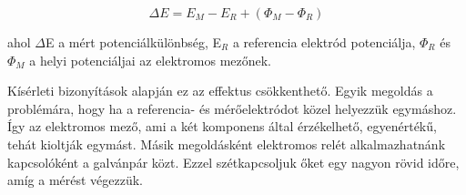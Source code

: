 \begin{equation}
\Delta E = E_M - E_R + (\Phi_M - \Phi_R) 
\label{eq:field1}
\end{equation}

ahol $\Delta$E a mért potenciálkülönbség, E$_R$ a referencia elektród potenciálja, $\Phi_R$ és $\Phi_M$ a helyi potenciáljai az elektromos mezőnek. 

Kísérleti bizonyítások alapján ez az effektus csökkenthető. Egyik megoldás a problémára, hogy ha a referencia- és mérőelektródot közel helyezzük egymáshoz. Így az elektromos mező, ami a két komponens által érzékelhető, egyenértékű, tehát kioltják egymást. Másik megoldásként elektromos relét alkalmazhatnánk kapcsolóként a galvánpár közt. Ezzel szétkapcsoljuk őket egy nagyon rövid időre, amíg a mérést végezzük.




